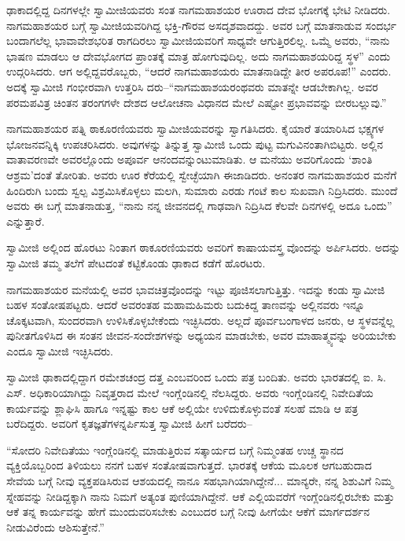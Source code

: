 ಢಾಕಾದಲ್ಲಿದ್ದ ದಿನಗಳಲ್ಲೇ ಸ್ವಾಮೀಜಿಯವರು ಸಂತ ನಾಗಮಹಾಶಯರ ಊರಾದ ದೇವ ಭೋಗಕ್ಕೆ ಭೇಟಿ ನೀಡಿದರು. ನಾಗಮಹಾಶಯರ ಬಗ್ಗೆ ಸ್ವಾಮೀಜಿಯವರಿಗಿದ್ದ ಭಕ್ತಿ-ಗೌರವ ಅಸದೃಶವಾದದ್ದು. ಅವರ ಬಗ್ಗೆ ಮಾತನಾಡುವ ಸಂದರ್ಭ ಬಂದಾಗಲೆಲ್ಲ ಭಾವಾವೇಶಭರಿತ ರಾಗದಿರಲು ಸ್ವಾಮೀಜಿಯವರಿಗೆ ಸಾಧ್ಯವೇ ಆಗುತ್ತಿರಲಿಲ್ಲ. ಒಮ್ಮೆ ಅವರು, “ನಾನು ಭಾಷಣ ಮಾಡಲು ಆ ದೇವಭೋಗದ ಪ್ರಾಂತಕ್ಕೆ ಮಾತ್ರ ಹೋಗುವುದಿಲ್ಲ. ಅದು ನಾಗಮಹಾಶಯರಿದ್ದ ಸ್ಥಳ” ಎಂದು ಉದ್ಗರಿಸಿದರು. ಆಗ ಅಲ್ಲಿದ್ದವರೊಬ್ಬರು, “ಆದರೆ ನಾಗಮಹಾಶಯರು ಮಾತನಾಡಿದ್ದೇ ತೀರ ಅಪರೂಪ!” ಎಂದರು. ಅದಕ್ಕೆ ಸ್ವಾಮೀಜಿ ಗಂಭೀರವಾಗಿ ಉತ್ತರಿಸಿ ದರು–“ನಾಗಮಹಾಶಯರಂಥವರು ಮಾತನ್ನೇ ಆಡಬೇಕಾಗಿಲ್ಲ. ಅವರ ಪರಮಪವಿತ್ರ ಚಿಂತನ ತರಂಗಗಳೇ ದೇಶದ ಆಲೋಚನಾ ವಿಧಾನದ ಮೇಲೆ ಎಷ್ಟೋ ಪ್ರಭಾವವನ್ನು ಬೀರಬಲ್ಲುವು.”

ನಾಗಮಹಾಶಯರ ಪತ್ನಿ ಠಾಕೂರಣಿಯವರು ಸ್ವಾಮೀಜಿಯವರನ್ನು ಸ್ವಾಗತಿಸಿದರು. ಕೈಯಾರೆ ತಯಾರಿಸಿದ ಭಕ್ಷ್ಯಗಳ ಭೋಜನವನ್ನಿಕ್ಕಿ ಉಪಚರಿಸಿದರು. ಅವುಗಳನ್ನು ತಿನ್ನುತ್ತ ಸ್ವಾಮೀಜಿ ಒಂದು ಪುಟ್ಟ ಮಗುವಿನಂತಾಗಿಬಿಟ್ಟರು. ಅಲ್ಲಿನ ವಾತಾವರಣವೇ ಅವರಲ್ಲೊಂದು ಅಪೂರ್ವ ಆನಂದವನ್ನುಂಟುಮಾಡಿತು. ಆ ಮನೆಯು ಅವರಿಗೊಂದು ‘ಶಾಂತಿ ಆಶ್ರಮ’ದಂತೆ ತೋರಿತು. ಅವರು ಊರ ಕೆರೆಯಲ್ಲಿ ಸ್ವೇಚ್ಛೆಯಾಗಿ ಈಜಾಡಿದರು. ಅನಂತರ ನಾಗಮಹಾಶಯರ ಮನೆಗೆ ಹಿಂದಿರುಗಿ ಬಂದು ಸ್ವಲ್ಪ ವಿಶ್ರಮಿಸಿಕೊಳ್ಳಲು ಮಲಗಿ, ಸುಮಾರು ಎರಡು ಗಂಟೆ ಕಾಲ ಸುಖವಾಗಿ ನಿದ್ರಿಸಿದರು. ಮುಂದೆ ಅವರು ಈ ಬಗ್ಗೆ ಮಾತನಾಡುತ್ತ, “ನಾನು ನನ್ನ ಜೀವನದಲ್ಲಿ ಗಾಢವಾಗಿ ನಿದ್ರಿಸಿದ ಕೆಲವೇ ದಿನಗಳಲ್ಲಿ ಅದೂ ಒಂದು” ಎನ್ನುತ್ತಾರೆ.

ಸ್ವಾಮೀಜಿ ಅಲ್ಲಿಂದ ಹೊರಟು ನಿಂತಾಗ ಠಾಕೂರಣಿಯವರು ಅವರಿಗೆ ಕಾಷಾಯವಸ್ತ್ರ ವೊಂದನ್ನು ಅರ್ಪಿಸಿದರು. ಅದನ್ನು ಸ್ವಾಮೀಜಿ ತಮ್ಮ ತಲೆಗೆ ಪೇಟದಂತೆ ಕಟ್ಟಿಕೊಂಡು ಢಾಕಾದ ಕಡೆಗೆ ಹೊರಟರು.

ನಾಗಮಹಾಶಯರ ಮನೆಯಲ್ಲಿ ಅವರ ಭಾವಚಿತ್ರವೊಂದನ್ನು ಇಟ್ಟು ಪೂಜಿಸಲಾಗುತ್ತಿತ್ತು. ಇದನ್ನು ಕಂಡು ಸ್ವಾಮೀಜಿ ಬಹಳ ಸಂತೋಷಪಟ್ಟರು. ಆದರೆ ಅವರಂತಹ ಮಹಾಮಹಿಮರು ಬದುಕಿದ್ದ ತಾಣವನ್ನು ಅಲ್ಲಿನವರು ಇನ್ನೂ ಚೊಕ್ಕಟವಾಗಿ, ಸುಂದರವಾಗಿ ಉಳಿಸಿಕೊಳ್ಳಬೇಕೆಂದು ಇಚ್ಛಿಸಿದರು. ಅಲ್ಲದೆ ಪೂರ್ವಬಂಗಾಳದ ಜನರು, ಆ ಸ್ಥಳವನ್ನೆಲ್ಲ ಪುನೀತಗೊಳಿಸಿದ ಈ ಸಂತನ ಜೀವನ-ಸಂದೇಶಗಳನ್ನು ಅಧ್ಯಯನ ಮಾಡಬೇಕು, ಅವರ ಮಾಹಾತ್ಮ್ಯವನ್ನು ಅರಿಯಬೇಕು ಎಂದೂ ಸ್ವಾಮೀಜಿ ಇಚ್ಛಿಸಿದರು.

ಸ್ವಾಮೀಜಿ ಢಾಕಾದಲ್ಲಿದ್ದಾಗ ರಮೇಶಚಂದ್ರ ದತ್ತ ಎಂಬವರಿಂದ ಒಂದು ಪತ್ರ ಬಂದಿತು. ಅವರು ಭಾರತದಲ್ಲಿ ಐ. ಸಿ. ಎಸ್. ಅಧಿಕಾರಿಯಾಗಿದ್ದು ನಿವೃತ್ತರಾದ ಮೇಲೆ ಇಂಗ್ಲೆಂಡಿನಲ್ಲಿ ನೆಲಸಿದ್ದರು. ಅವರು ಇಂಗ್ಲೆಂಡಿನಲ್ಲಿ ನಿವೇದಿತೆಯ ಕಾರ್ಯವನ್ನು ಶ್ಲಾಘಿಸಿ ಹಾಗೂ ಇನ್ನಷ್ಟು ಕಾಲ ಆಕೆ ಅಲ್ಲಿಯೇ ಉಳಿದುಕೊಳ್ಳುವಂತೆ ಸಲಹೆ ಮಾಡಿ ಆ ಪತ್ರ ಬರೆದಿದ್ದರು. ಅವರಿಗೆ ಕೃತಜ್ಞತೆಗಳನ್ನರ್ಪಿಸುತ್ತ ಸ್ವಾಮೀಜಿ ಹೀಗೆ ಬರೆದರು–

“ಸೋದರಿ ನಿವೇದಿತೆಯು ಇಂಗ್ಲೆಂಡಿನಲ್ಲಿ ಮಾಡುತ್ತಿರುವ ಸತ್ಕಾರ್ಯದ ಬಗ್ಗೆ ನಿಮ್ಮಂತಹ ಉಚ್ಚ ಸ್ಥಾನದ ವ್ಯಕ್ತಿಯೊಬ್ಬರಿಂದ ತಿಳಿಯಲು ನನಗೆ ಬಹಳ ಸಂತೋಷವಾಗುತ್ತದೆ. ಭಾರತಕ್ಕೆ ಆಕೆಯ ಮೂಲಕ ಆಗಬಹುದಾದ ಸೇವೆಯ ಬಗ್ಗೆ ನೀವು ವ್ಯಕ್ತಪಡಿಸಿರುವ ಆಶಯದಲ್ಲಿ ನಾನೂ ಸಹಭಾಗಿಯಾಗಿದ್ದೇನೆ... ಮಾನ್ಯರೇ, ನನ್ನ ಶಿಶುವಿಗೆ ನಿಮ್ಮ ಸ್ನೇಹವನ್ನು ನೀಡಿದ್ದಕ್ಕಾಗಿ ನಾನು ನಿಮಗೆ ಅತ್ಯಂತ ಪುಣಿಯಾಗಿದ್ದೇನೆ. ಆಕೆ ಎಲ್ಲಿಯವರೆಗೆ ಇಂಗ್ಲೆಂಡಿನಲ್ಲಿರಬೇಕು ಮತ್ತು ಆಕೆ ತನ್ನ ಕಾರ್ಯವನ್ನು ಹೇಗೆ ಮುಂದುವರಿಸಬೇಕು ಎಂಬುದರ ಬಗ್ಗೆ ನೀವು ಹೀಗೆಯೇ ಆಕೆಗೆ ಮಾರ್ಗದರ್ಶನ ನೀಡುವಿರೆಂದು ಆಶಿಸುತ್ತೇನೆ.”

